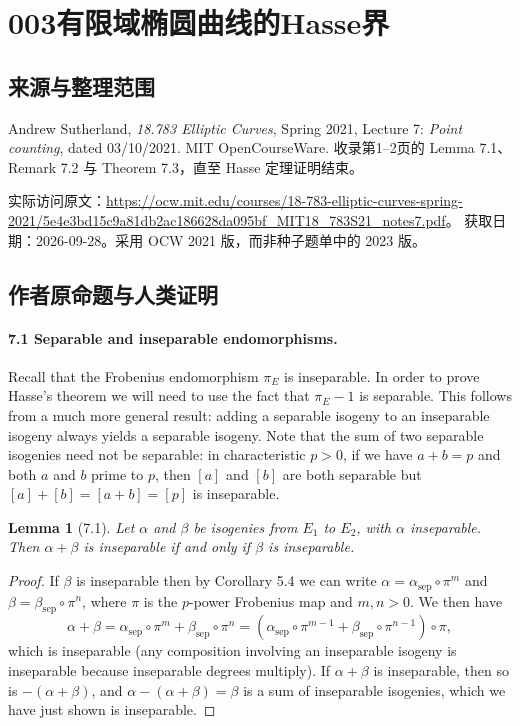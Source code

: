 \documentclass[UTF8,11pt]{ctexart}
\newtheorem*{lemma}{Lemma}
\begin{document}
\section*{003\quad 有限域椭圆曲线的Hasse界}
\subsection*{来源与整理范围}
Andrew Sutherland, \emph{18.783 Elliptic Curves}, Spring 2021, Lecture 7: \emph{Point counting}, dated 03/10/2021. MIT OpenCourseWare. 收录第1--2页的 Lemma 7.1、Remark 7.2 与 Theorem 7.3，直至 Hasse 定理证明结束。

实际访问原文：\url{https://ocw.mit.edu/courses/18-783-elliptic-curves-spring-2021/5e4e3bd15c9a81db2ac186628da095bf_MIT18_783S21_notes7.pdf}。
获取日期：2026-09-28。采用 OCW 2021 版，而非种子题单中的 2023 版。

\subsection*{作者原命题与人类证明}
\paragraph{7.1 Separable and inseparable endomorphisms.}
Recall that the Frobenius endomorphism $\pi_E$ is inseparable. In order to prove Hasse's theorem we will need to use the fact that $\pi_E-1$ is separable. This follows from a much more general result: adding a separable isogeny to an inseparable isogeny always yields a separable isogeny. Note that the sum of two separable isogenies need not be separable: in characteristic $p>0$, if we have $a+b=p$ and both $a$ and $b$ prime to $p$, then $[a]$ and $[b]$ are both separable but $[a]+[b]=[a+b]=[p]$ is inseparable.

\begin{lemma}[7.1]
Let $\alpha$ and $\beta$ be isogenies from $E_1$ to $E_2$, with $\alpha$ inseparable. Then $\alpha+\beta$ is inseparable if and only if $\beta$ is inseparable.
\end{lemma}
\begin{proof}
If $\beta$ is inseparable then by Corollary 5.4 we can write $\alpha=\alpha_{\mathrm{sep}}\circ\pi^m$ and $\beta=\beta_{\mathrm{sep}}\circ\pi^n$, where $\pi$ is the $p$-power Frobenius map and $m,n>0$. We then have
\[
\alpha+\beta=\alpha_{\mathrm{sep}}\circ\pi^m+\beta_{\mathrm{sep}}\circ\pi^n
=(\alpha_{\mathrm{sep}}\circ\pi^{m-1}+\beta_{\mathrm{sep}}\circ\pi^{n-1})\circ\pi,
\]
which is inseparable (any composition involving an inseparable isogeny is inseparable because inseparable degrees multiply). If $\alpha+\beta$ is inseparable, then so is $-(\alpha+\beta)$, and $\alpha-(\alpha+\beta)=\beta$ is a sum of inseparable isogenies, which we have just shown is inseparable.
\end{proof}
\end{document}
